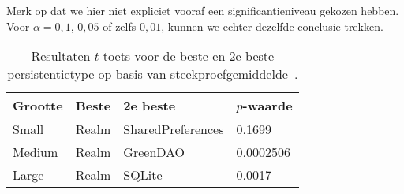 Merk op dat we hier niet expliciet vooraf een significantieniveau gekozen hebben. Voor $\alpha = 0,1$, $0,05$ of zelfs $0,01$, kunnen we echter dezelfde conclusie trekken.

\begin{table}
  \begin{center}
\begin{tabular}{llll}
  \toprule
  \textbf{Grootte} & \textbf{Beste} & \textbf{2e beste} & \textbf{$p$-waarde} \\ \midrule
  Small            & Realm          & SharedPreferences & 0.1699     \\
  Medium           & Realm          & GreenDAO          & 0.0002506  \\
  Large            & Realm          & SQLite            & 0.0017     \\ \bottomrule
\end{tabular}
\end{center}
  \caption{Resultaten $t$-toets voor de beste en 2e beste persistentietype op basis van steekproefgemiddelde~\autocite{Akin2016}.}
  \label{tab:akin2016-resultaten-ttoets}
\end{table}
